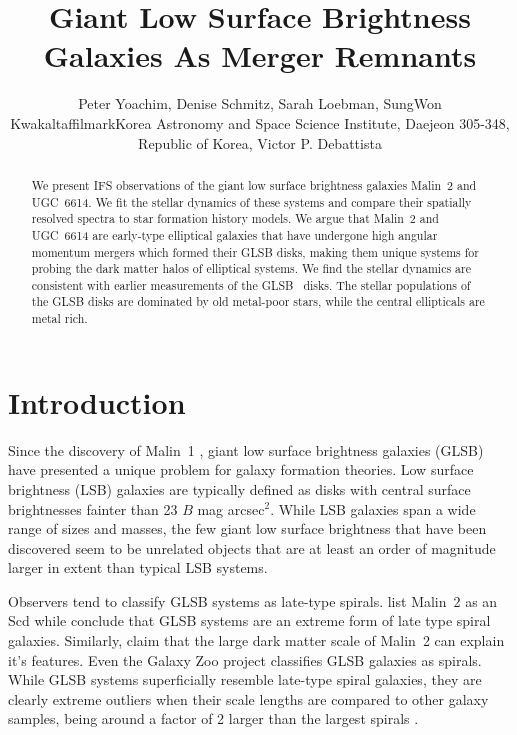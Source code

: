 \documentclass[12pt,preprint]{aastex}
\newcommand\HI{\ion{H}{1}}
\begin{document}
\title{Giant Low Surface Brightness Galaxies As Merger Remnants}


\author{Peter Yoachim, Denise Schmitz, Sarah Loebman\altaffiliation{}, SungWon Kwakaltaffilmark{Korea Astronomy and Space Science Institute, Daejeon 305-348, Republic of Korea}, Victor P. Debattista
  }


\begin{abstract}
We present IFS observations of the giant low surface brightness galaxies Malin~2 and UGC~6614.
We fit the stellar dynamics of these systems and compare their spatially resolved spectra to star formation history models.
We argue that Malin~2 and UGC~6614 are early-type elliptical galaxies that have undergone high angular momentum mergers which formed their GLSB disks, making them unique systems for probing the dark matter halos of elliptical systems.
We find the stellar dynamics are consistent with earlier measurements of the GLSB \HI\ disks.
The stellar populations of the GLSB disks are dominated by old metal-poor stars, while the central ellipticals are metal rich.

\end{abstract}


\section{Introduction}

Since the discovery of Malin~1 \citep{Bothun87}, giant low surface brightness galaxies (GLSB) have presented a unique problem for galaxy formation theories.
Low surface brightness (LSB) galaxies are typically defined as disks with central surface brightnesses fainter than 23 $B$ mag arcsec$^2$.
While LSB galaxies span a wide range of sizes and masses, the few giant low surface brightness that have been discovered seem to be unrelated objects that are at least an order of magnitude larger in extent than typical LSB systems. 

Observers tend to classify GLSB systems as late-type spirals.
\citet{Matthews01b} list Malin~2 as an Scd while \citet{Das13} conclude that GLSB systems are an extreme form of late type spiral galaxies.
Similarly, \citet{Kasparova14} claim that the large dark matter scale of Malin~2 can explain it's features.
Even the Galaxy Zoo project \citep{Willett13}  classifies GLSB galaxies as spirals.
While GLSB systems superficially resemble late-type spiral galaxies, they are clearly extreme outliers when their scale lengths are compared to other galaxy samples, being around a factor of 2 larger than the largest spirals \citep[Figure~4]{Dalcanton97}. 
\end{document}
